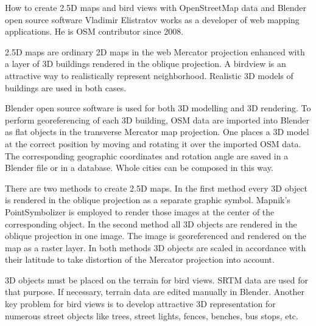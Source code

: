 %
{How to create 2.5D maps and bird views with OpenStreetMap data and Blender open source software}%
{Vladimir Elistratov works as a developer of web mapping applications. He is OSM contributor since 2008. }%
{2.5D maps are ordinary 2D maps in the web Mercator projection enhanced with a layer of 3D buildings rendered in the oblique projection. A birdview is an attractive way to realistically represent neighborhood. Realistic 3D models of buildings are used in both cases.

Blender open source software is used for both 3D modelling and 3D rendering. To perform georeferencing of each 3D building, OSM data are imported into Blender as flat objects in the transverse Mercator map projection. One places a 3D model at the correct position by moving and rotating it over the imported OSM data. The corresponding geographic coordinates and rotation angle are saved in a Blender file or in a database. Whole cities can be composed in this way.

There are two methods to create 2.5D maps. In the first method every 3D object is rendered in the oblique projection as a separate graphic symbol. Mapnik's PointSymbolizer is employed to render those images at the center of the corresponding object. In the second method all 3D objects are rendered in the oblique projection in one image. The image is georeferenced and rendered on the map as a raster layer. In both methods 3D objects are scaled in accordance with their latitude to take distortion of the Mercator projection into account.

3D objects must be placed on the terrain for bird views. SRTM data are used for that purpose. If necessary, terrain data are edited manually in Blender. Another key problem for bird views is to develop attractive 3D representation for numerous street objects like trees, street lights, fences, benches, bus stops, etc.}

\talkabstract{}%
{}%
{}%
{}

